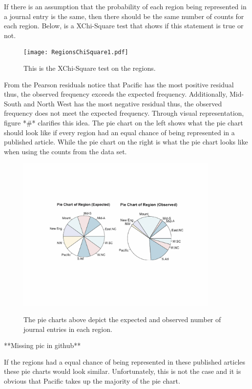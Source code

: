 \documentclass[12pt, letterpaper]{article}
\begin{document}
If there is an assumption that the probability of each region being represented in a journal entry is the same, then there should be the same number of counts for each region. Below, is a XChi-Square test that shows if this statement is true or not. 

\begin{figure}[h]
\begin{center}
\texttt{[image: RegionsChiSquare1.pdf]}
\label{fig: Region XChi-Square}
\caption{This is the XChi-Square test on the regions.}
\end{center}
\end{figure}

From the Pearson residuals notice that Pacific has the most positive residual thus, the observed frequency exceeds the expected frequency. Additionally, Mid-South and North West has the most negative residual thus, the observed frequency does not meet the expected frequency. Through visual representation, figure *#* clarifies this idea. The pie chart on the left shows what the pie chart should look like if every region had an equal chance of being represented in a published article. While the pie chart on the right is what the pie chart looks like when using the counts from the data set. 

\begin{figure}[h]
\begin{center}
\includegraphics[width=10cm]{RegionsPieChart.pdf}
\label{fig: Region Pie Chart}
\caption{The pie charts above depict the expected and observed number of journal entries in each region.}
\end{center}
\end{figure}

**Missing pic in github**

If the regions had a equal chance of being represented in these published articles these pie charts would look similar. Unfortunately, this is not the case and it is obvious that Pacific takes up the majority of the pie chart.
\end{document}
